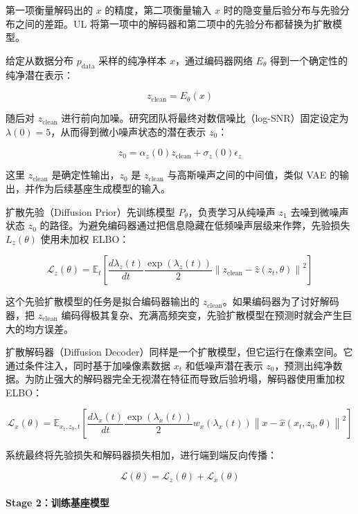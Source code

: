 第一项衡量解码出的 \(x\) 的精度，第二项衡量输入 \(x\) 时的隐变量后验分布与先验分布之间的差距。UL 将第一项中的解码器和第二项中的先验分布都替换为扩散模型。

给定从数据分布 \(p_{\mathrm{data}}\) 采样的纯净样本 \(x\)，通过编码器网络 \(E_\theta\) 得到一个确定性的纯净潜在表示：

\[
z_{\mathrm{clean}}=E_\theta(x)
\]

随后对 \(z_{\mathrm{clean}}\) 进行前向加噪。研究团队将最终对数信噪比（log-SNR）固定设定为 \(\lambda(0)=5\)，从而得到微小噪声状态的潜在表示 \(z_0\)：

\[
z_0=\alpha_z(0)z_{\mathrm{clean}}+\sigma_z(0)\epsilon_z
\]

这里 \(z_{\mathrm{clean}}\) 是确定性输出，\(z_0\) 是 \(z_{\mathrm{clean}}\) 与高斯噪声之间的中间值，类似 VAE 的输出，并作为后续基座生成模型的输入。

扩散先验（Diffusion Prior）先训练模型 \(P_\theta\)，负责学习从纯噪声 \(z_1\) 去噪到微噪声状态 \(z_0\) 的路径。为避免编码器通过把信息隐藏在低频噪声层级来作弊，先验损失 \(L_z(\theta)\) 使用未加权 ELBO：

\[
\mathcal{L}_z(\theta)=
\mathbb{E}_t
\left[
\frac{d\lambda_z(t)}{dt}
\frac{\exp(\lambda_z(t))}{2}
\left\|
z_{\mathrm{clean}}-\hat{z}(z_t,\theta)
\right\|^2
\right]
\]

这个先验扩散模型的任务是拟合编码器输出的 \(z_{\mathrm{clean}}\)。如果编码器为了讨好解码器，把 \(z_{\mathrm{clean}}\) 编码得极其复杂、充满高频突变，先验扩散模型在预测时就会产生巨大的均方误差。

扩散解码器（Diffusion Decoder）同样是一个扩散模型，但它运行在像素空间。它通过条件注入，同时基于加噪像素数据 \(x_t\) 和低噪声潜在表示 \(z_0\)，预测出纯净数据。为防止强大的解码器完全无视潜在特征而导致后验坍塌，解码器使用重加权 ELBO：

\[
\mathcal{L}_x(\theta)=
\mathbb{E}_{x_t,z_0,t}
\left[
\frac{d\lambda_x(t)}{dt}
\frac{\exp(\lambda_x(t))}{2}
w_x(\lambda_x(t))
\left\|
x-\hat{x}(x_t,z_0,\theta)
\right\|^2
\right]
\]

系统最终将先验损失和解码器损失相加，进行端到端反向传播：

\[
\mathcal{L}(\theta)=\mathcal{L}_z(\theta)+\mathcal{L}_x(\theta)
\]

\hypertarget{stage-2ux8badux7ec3ux57faux5ea7ux6a21ux578b}{%
\paragraph{Stage 2：训练基座模型}\label{stage-2ux8badux7ec3ux57faux5ea7ux6a21ux578b}}

